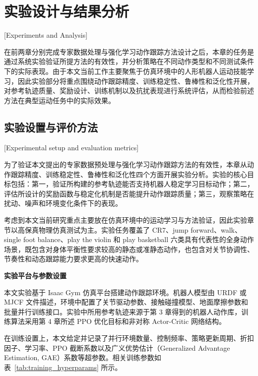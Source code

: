 
\chapter{实验设计与结果分析}[Experiments and Analysis]

在前两章分别完成专家数据处理与强化学习动作跟踪方法设计之后，本章的任务是通过系统实验验证所提方法的有效性，并分析策略在不同动作类型和不同测试条件下的实际表现。由于本文当前工作主要聚焦于仿真环境中的人形机器人运动技能学习，因此实验部分将重点围绕动作跟踪精度、训练稳定性、鲁棒性和泛化性开展，对参考轨迹质量、奖励设计、训练机制以及抗扰表现进行系统评估，从而检验前述方法在典型运动任务中的实际效果。

\section{实验设置与评价方法}[Experimental setup and evaluation metrics]

为了验证本文提出的专家数据预处理与强化学习动作跟踪方法的有效性，本章从动作跟踪精度、训练稳定性、鲁棒性和泛化性四个方面开展实验分析。实验的核心目标包括：第一，验证所构建的参考轨迹能否支持机器人稳定学习目标动作；第二，评估所设计的奖励函数与稳定化机制是否能提升动作跟踪质量；第三，观察策略在扰动、噪声和环境变化条件下的表现。

考虑到本文当前研究重点主要放在仿真环境中的运动学习与方法验证，因此实验章节以高保真物理仿真测试为主。实验任务覆盖了 CR7、jump forward、walk、single foot balance、play the violin 和 play basketball 六类具有代表性的全身动作场景，既包含对身体平衡性要求较高的静态或准静态动作，也包含对关节协调性、节奏性和动态跟踪能力要求更高的快速动作。

\noindent\textbf{实验平台与参数设置}

本文实验基于 Isaac Gym 仿真平台搭建动作跟踪环境\cite{isaacgym2021}。机器人模型由 URDF 或 MJCF 文件描述，环境中配置了关节驱动参数、接触碰撞模型、地面摩擦参数和批量并行训练接口。实验中所用参考轨迹来源于第 3 章得到的机器人动作库，训练算法采用第 4 章所述 PPO 优化目标和非对称 Actor-Critic 网络结构。

在训练设置上，本文给定并记录了并行环境数量、控制频率、策略更新周期、折扣因子、学习率、PPO 截断系数以及广义优势估计（Generalized Advantage Estimation, GAE）系数等超参数。相关训练参数如表~\ref{tab:training_hyperparams} 所示。

